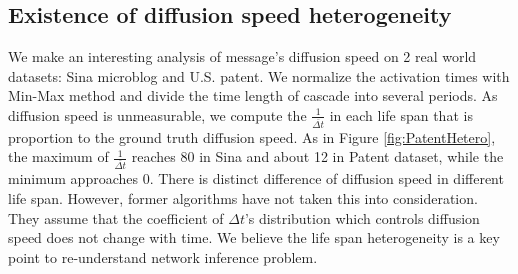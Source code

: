 \subsection{Existence of diffusion speed heterogeneity}
We make an interesting analysis of message's diffusion speed on 2 real world datasets: Sina microblog and U.S. patent. We normalize the activation times with Min-Max method and divide the time length of cascade into several periods.
As diffusion speed is unmeasurable, we compute the $\frac{1}{\overline{\Delta t}}$ in each life span that is proportion to the ground truth diffusion speed. As in Figure \ref{fig:PatentHetero}, the maximum of $\frac{1}{\overline{\Delta t}}$ reaches 80 in Sina and about 12 in Patent dataset, while the minimum approaches 0. There is distinct difference of diffusion speed in different life span. However, former algorithms have not taken this into consideration. They assume that the coefficient of $\Delta t$'s distribution which controls diffusion speed does not change with time. We believe the life span heterogeneity is a key point to re-understand network inference problem.

